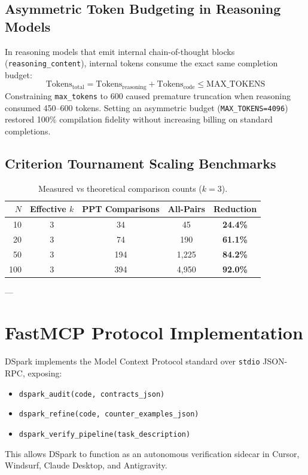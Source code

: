 \documentclass[10pt,twocolumn,letterpaper]{article}
\begin{document}
\subsection{Asymmetric Token Budgeting in Reasoning Models}
In reasoning models that emit internal chain-of-thought blocks (\texttt{reasoning\_content}), internal tokens consume the exact same completion budget:
\begin{equation}
\text{Tokens}_{\text{total}} = \text{Tokens}_{\text{reasoning}} + \text{Tokens}_{\text{code}} \le \text{MAX\_TOKENS}
\end{equation}
Constraining \texttt{max\_tokens} to 600 caused premature truncation when reasoning consumed 450--600 tokens. Setting an asymmetric budget (\texttt{MAX\_TOKENS=4096}) restored 100\% compilation fidelity without increasing billing on standard completions.

\subsection{Criterion Tournament Scaling Benchmarks}
\begin{table}[h]
\centering
\footnotesize
\caption{Measured vs theoretical comparison counts ($k=3$).}
\begin{tabular}{rcccc}
\toprule
$N$ & Effective $k$ & PPT Comparisons & All-Pairs & Reduction \\
\midrule
10 & 3 & 34 & 45 & \textbf{24.4\%} \\
20 & 3 & 74 & 190 & \textbf{61.1\%} \\
50 & 3 & 194 & 1,225 & \textbf{84.2\%} \\
100 & 3 & 394 & 4,950 & \textbf{92.0\%} \\
\bottomrule
\end{tabular}
\end{table}

---

\section{FastMCP Protocol Implementation}
DSpark implements the Model Context Protocol standard over \texttt{stdio} JSON-RPC, exposing:
\begin{itemize}
    \item \texttt{dspark\_audit(code, contracts\_json)}
    \item \texttt{dspark\_refine(code, counter\_examples\_json)}
    \item \texttt{dspark\_verify\_pipeline(task\_description)}
\end{itemize}
This allows DSpark to function as an autonomous verification sidecar in Cursor, Windsurf, Claude Desktop, and Antigravity.
\end{document}
